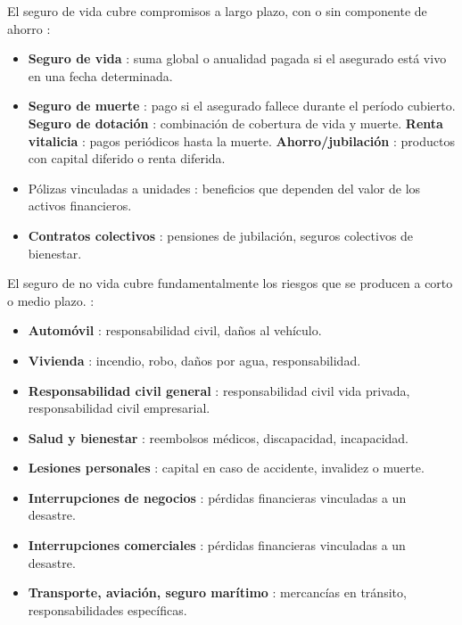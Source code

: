 \begin{f}
	
	El seguro de vida cubre compromisos a largo plazo, con o sin componente de ahorro :
	\begin{itemize}[nosep]
		\item \textbf{Seguro de vida} : suma global o anualidad pagada si el asegurado está vivo en una fecha determinada.
		\item \textbf{Seguro de muerte} : pago si el asegurado fallece durante el período cubierto.
		\textbf{Seguro de dotación} : combinación de cobertura de vida y muerte.
		\textbf{Renta vitalicia} : pagos periódicos hasta la muerte.
		\textbf{Ahorro/jubilación} : productos con capital diferido o renta diferida.
		\item Pólizas vinculadas a unidades : beneficios que dependen del valor de los activos financieros.
		\item \textbf{Contratos colectivos} : pensiones de jubilación, seguros colectivos de bienestar.
	\end{itemize}
	
	
	El seguro de no vida cubre fundamentalmente los riesgos que se producen a corto o medio plazo. :
	\begin{itemize}[nosep]
		\item \textbf{Automóvil} : responsabilidad civil, daños al vehículo.
		\item \textbf{Vivienda} : incendio, robo, daños por agua, responsabilidad.
		\item \textbf{Responsabilidad civil general }: responsabilidad civil vida privada, responsabilidad civil empresarial.
		\item \textbf{Salud y bienestar} : reembolsos médicos, discapacidad, incapacidad.
		\item \textbf{Lesiones personales} : capital en caso de accidente, invalidez o muerte.
		\item \textbf{Interrupciones de negocios} : pérdidas financieras vinculadas a un desastre.
		\item \textbf{Interrupciones comerciales} : pérdidas financieras vinculadas a un desastre.
		\item \textbf{Transporte, aviación, seguro marítimo} : mercancías en tránsito, responsabilidades específicas.
	\end{itemize}
	

\end{f}
